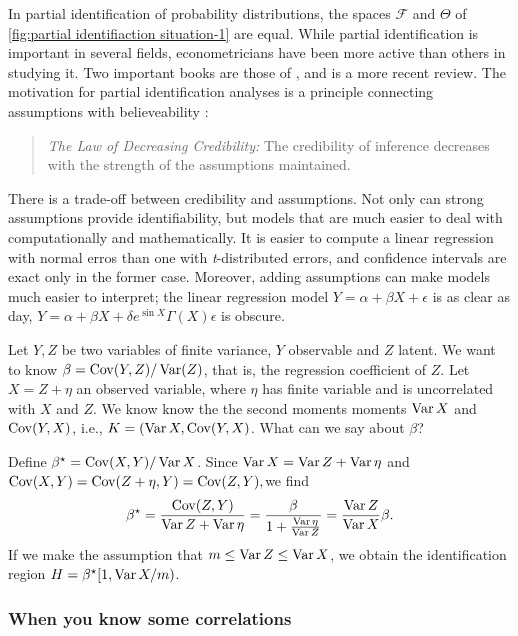 In partial identification of probability distributions, the spaces
$\mathcal{F}$ and $\Theta$ of \ref{fig:partial identifiaction situation-1}
are equal. While partial identification is important in several fields,
econometricians have been more active than others in studying it.
Two important books are those of \cite{Manski1999-ab,Manski2003-aq},
and \cite{Tamer2010-rj} is a more recent review. The motivation
for partial identification analyses is a principle connecting assumptions
with believeability \cite[p. 1]{Manski2003-aq}:
\begin{quote}
\emph{The Law of Decreasing Credibility: }The credibility of inference
decreases with the strength of the assumptions maintained.
\end{quote}
There is a trade-off between credibility and assumptions. Not only
can strong assumptions provide identifiability, but models that are
much easier to deal with computationally and mathematically. It is
easier to compute a linear regression with normal erros than one with
\emph{t}-distributed errors, and confidence intervals are exact only
in the former case. Moreover, adding assumptions can make models much
easier to interpret; the linear regression model $Y=\alpha+\beta X+\epsilon$
is as clear as day, $Y=\alpha+\beta X+\delta e^{\sin X}\Gamma(X)\epsilon$
is obscure. 
\begin{example}
 Let $Y,Z$ be two variables of finite variance, $Y$ observable
and $Z$ latent. We want to know $\beta=\operatorname{Cov}(Y,Z)/\operatorname{Var}(Z)$, that
is, the regression coefficient of $Z$. Let $X=Z+\eta$ an observed
variable, where $\eta$ has finite variable and is uncorrelated with
$X$ and $Z$. We know know the the second moments moments $\operatorname{Var} X$
and $\operatorname{Cov}(Y,X)$, i.e., $K=(\operatorname{Var} X,\operatorname{Cov}(Y,X)$. What can we say about
$\beta$? 

Define $\beta^{\star}=\operatorname{Cov}(X,Y)/\operatorname{Var} X$. Since $\operatorname{Var} X=\operatorname{Var} Z+\operatorname{Var}\eta$
and $\operatorname{Cov}(X,Y)=\operatorname{Cov}(Z+\eta,Y)=\operatorname{Cov}(Z,Y),$we find
\[
\beta^{\star}=\frac{\operatorname{Cov}(Z,Y)}{\operatorname{Var} Z+\operatorname{Var}\eta}=\frac{\beta}{1+\frac{\operatorname{Var}\eta}{\operatorname{Var} Z}}=\frac{\operatorname{Var} Z}{\operatorname{Var} X}\beta.
\]
If we make the assumption that $m\leq\operatorname{Var} Z\leq\operatorname{Var} X$, we obtain
the identification region $H=\beta^{\star}[1,\operatorname{Var} X/m)$. 
\end{example}


\subsubsection{When you know some correlations}

